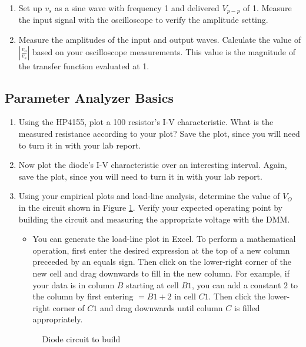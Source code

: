 \documentclass{article}
\begin{document}
\begin{enumerate}
\item Set up $v_s$ as a sine wave with frequency \unit{1}{\kilo\hertz} and delivered $V_{p-p}$ of \unit{1}{\volt}. Measure the input signal with the oscilloscope to verify the amplitude setting. 

\item Measure the amplitudes of the input and output waves. Calculate the value of $|\frac{v_{o}}{v_s}|$ based on your oscilloscope measurements. This value is the magnitude of the transfer function evaluated at \unit{1}{\kilo\hertz}.


\end{enumerate}

\subsection{Parameter Analyzer Basics}
\begin{enumerate}

\item Using the HP4155, plot a \unit{100}{\ohm} resistor's I-V characteristic. What is the measured resistance according to your plot? Save the plot, since you will need to turn it in with your lab report. 

\item Now plot the diode's I-V characteristic over an interesting interval. Again, save the plot, since you will need to turn it in with your lab report.

\item Using your empirical plots and load-line analysis, determine the value of $V_O$ in the circuit shown in Figure \ref{diode}. Verify your expected operating point by building the circuit and measuring the appropriate voltage with the DMM.

\begin{itemize}
\item You can generate the load-line plot in Excel. To perform a mathematical operation, first enter the desired expression at the top of a new column preceeded by an equals sign. Then click on the lower-right corner of the new cell and drag downwards to fill in the new column. For example, if your data is in column $B$ starting at cell $B1$, you can add a constant $2$ to the column by first entering $=B1+2$ in cell $C1$. Then click the lower-right corner of $C1$ and drag downwards until column $C$ is filled appropriately.  
\end{itemize}

	\begin{figure}[!htb]
		
		\centerline{\box\graph}
		\caption{Diode circuit to build}
		\label{diode}
	\end{figure}

\end{enumerate}
\end{document}

